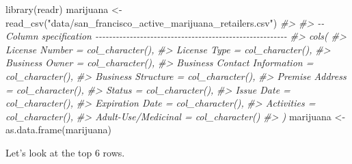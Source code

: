 \documentclass[
  12pt,
]{book}
\newenvironment{Shaded}{\begin{snugshade}}{\end{snugshade}}
\newcommand{\CommentTok}[1]{\textcolor[rgb]{0.37,0.37,0.37}{\textit{#1}}}
\newcommand{\FunctionTok}[1]{\textcolor[rgb]{0,0,0}{#1}}
\newcommand{\NormalTok}[1]{#1}
\newcommand{\OtherTok}[1]{\textcolor[rgb]{0.37,0.37,0.37}{#1}}
\newcommand{\StringTok}[1]{\textcolor[rgb]{0.5,0.5,0.5}{#1}}
\begin{document}
\begin{Shaded}
\begin{Highlighting}[]
\FunctionTok{library}\NormalTok{(readr)}
\NormalTok{marijuana }\OtherTok{\textless{}{-}} \FunctionTok{read\_csv}\NormalTok{(}\StringTok{"data/san\_francisco\_active\_marijuana\_retailers.csv"}\NormalTok{)}
\CommentTok{\#\textgreater{} }
\CommentTok{\#\textgreater{} {-}{-} Column specification {-}{-}{-}{-}{-}{-}{-}{-}{-}{-}{-}{-}{-}{-}{-}{-}{-}{-}{-}{-}{-}{-}{-}{-}{-}{-}{-}{-}{-}{-}{-}{-}{-}{-}{-}{-}{-}{-}{-}{-}{-}{-}{-}{-}{-}{-}{-}{-}{-}{-}{-}{-}{-}{-}{-}{-}}
\CommentTok{\#\textgreater{} cols(}
\CommentTok{\#\textgreater{}   \textasciigrave{}License Number\textasciigrave{} = col\_character(),}
\CommentTok{\#\textgreater{}   \textasciigrave{}License Type\textasciigrave{} = col\_character(),}
\CommentTok{\#\textgreater{}   \textasciigrave{}Business Owner\textasciigrave{} = col\_character(),}
\CommentTok{\#\textgreater{}   \textasciigrave{}Business Contact Information\textasciigrave{} = col\_character(),}
\CommentTok{\#\textgreater{}   \textasciigrave{}Business Structure\textasciigrave{} = col\_character(),}
\CommentTok{\#\textgreater{}   \textasciigrave{}Premise Address\textasciigrave{} = col\_character(),}
\CommentTok{\#\textgreater{}   Status = col\_character(),}
\CommentTok{\#\textgreater{}   \textasciigrave{}Issue Date\textasciigrave{} = col\_character(),}
\CommentTok{\#\textgreater{}   \textasciigrave{}Expiration Date\textasciigrave{} = col\_character(),}
\CommentTok{\#\textgreater{}   Activities = col\_character(),}
\CommentTok{\#\textgreater{}   \textasciigrave{}Adult{-}Use/Medicinal\textasciigrave{} = col\_character()}
\CommentTok{\#\textgreater{} )}
\NormalTok{marijuana }\OtherTok{\textless{}{-}} \FunctionTok{as.data.frame}\NormalTok{(marijuana)}
\end{Highlighting}
\end{Shaded}

Let's look at the top 6 rows.
\end{document}
